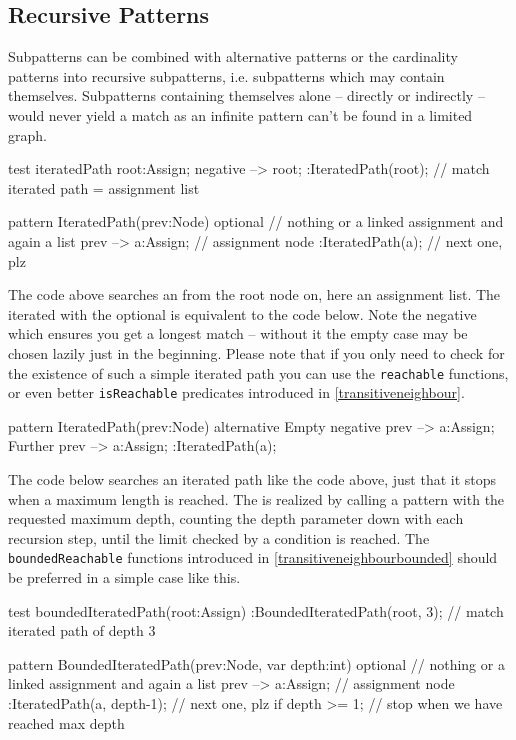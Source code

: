 \subsection{Recursive Patterns}

Subpatterns can be combined with alternative patterns or the cardinality patterns into recursive subpatterns, i.e. subpatterns which may contain themselves.
Subpatterns containing themselves alone -- directly or indirectly -- would never yield a match as an infinite pattern can't be found in a limited graph.

\begin{example}\label{exiterpath}
  \begin{grgen}
test iteratedPath
{
  root:Assign;
  negative { --> root; }
  :IteratedPath(root); // match iterated path = assignment list
}

pattern IteratedPath(prev:Node)
{
  optional { // nothing or a linked assignment and again a list
    prev --> a:Assign; // assignment node 
    :IteratedPath(a); // next one, plz
  }
}
  \end{grgen}
  
The code above searches an  from the root node on, here an assignment list. 
The iterated  with the optional is equivalent to the code below. Note the negative which ensures you get a longest match -- without it the empty case may be chosen lazily just in the beginning.
Please note that if you only need to check for the existence of such a simple iterated path you can use the \texttt{reachable} functions, or even better \texttt{isReachable} predicates introduced in \ref{transitiveneighbour}.

  \begin{grgen}
pattern IteratedPath(prev:Node)
{
  alternative {
    Empty {
      negative {
        prev --> a:Assign;
      }
    }
    Further {
      prev --> a:Assign;
      :IteratedPath(a);
    }
  }
}
  \end{grgen}

The code below searches an iterated path like the code above, just that it stops when a maximum length is reached.
The  is realized by 
calling a pattern with the requested maximum depth,
counting the depth parameter down with each recursion step,
until the limit checked by a condition is reached.
The \texttt{boundedReachable} functions introduced in \ref{transitiveneighbourbounded} should be preferred in a simple case like this.

  \begin{grgen}
test boundedIteratedPath(root:Assign)
{
  :BoundedIteratedPath(root, 3); // match iterated path of depth 3
}

pattern BoundedIteratedPath(prev:Node, var depth:int)
{
  optional { // nothing or a linked assignment and again a list
    prev --> a:Assign; // assignment node 
    :IteratedPath(a, depth-1); // next one, plz
    if{ depth >= 1; } // stop when we have reached max depth
  }
}
  \end{grgen}
\end{example}

